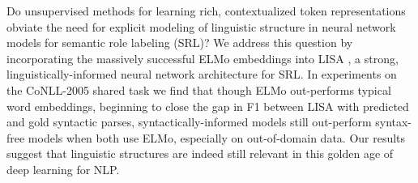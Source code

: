 Do unsupervised methods for learning rich, contextualized token representations obviate the need for explicit modeling of linguistic structure in neural network models for semantic role labeling (SRL)? We address this question by incorporating the massively successful ELMo embeddings \citep{peters2018deep} into LISA \citep{anon2018linguistically}, a strong, linguistically-informed neural network architecture for SRL. In experiments on the CoNLL-2005 shared task we find that though ELMo out-performs typical word embeddings, beginning to close the gap in F1 between LISA with predicted and gold syntactic parses, syntactically-informed models still out-perform syntax-free models when both use ELMo, especially on out-of-domain data. Our results suggest that linguistic structures are indeed still relevant in this golden age of deep learning for NLP.
